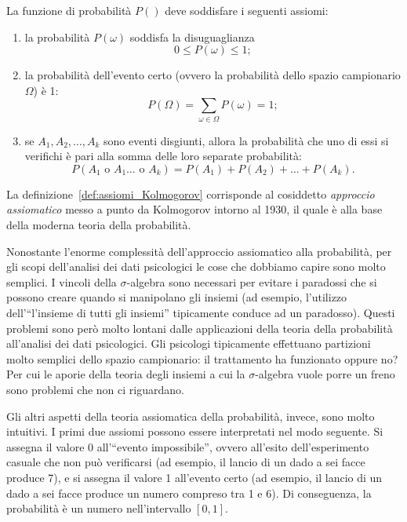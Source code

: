 La funzione di probabilità $P()$ deve soddisfare i seguenti assiomi:
\begin{enumerate}
\item la probabilità $P(\omega)$ soddisfa la disuguaglianza 
\begin{equation}
0 \leq P(\omega) \leq 1;
\end{equation}
\item la probabilità dell'evento certo (ovvero la probabilità dello spazio campionario $\Omega$) è 1:
\begin{equation}
P(\Omega) = \sum_{\omega \in \Omega} P(\omega) = 1;
\label{eq:tot_prob_sample_space}
\end{equation}
\item se $A_1, A_2, \dots, A_k$ sono eventi disgiunti, allora la probabilità che uno di essi si verifichi è pari alla somma delle loro separate probabilità:
\begin{equation}
P(A_1 \text{ o } A_1 \dots \text{ o } A_k) = P(A_1) + P(A_2) +\dots + P(A_k). \label{eq:kolmogorov_3}
\end{equation}
\end{enumerate}
La definizione~\ref{def:assiomi_Kolmogorov} corrisponde al cosiddetto \emph{approccio assiomatico} messo a punto da Kolmogorov intorno al 1930, il quale è alla base della moderna teoria della probabilità. 

Nonostante l'enorme complessità dell'approccio assiomatico alla probabilità, per gli scopi dell'analisi dei dati psicologici le cose che dobbiamo capire sono molto semplici.
I vincoli della $\sigma$-algebra sono necessari per evitare i paradossi che si possono creare quando si manipolano gli insiemi (ad esempio, l'utilizzo dell'\enquote{l'insieme di tutti gli insiemi} tipicamente conduce ad un paradosso).
Questi problemi sono però molto lontani dalle applicazioni della teoria della probabilità all'analisi dei dati psicologici.
Gli psicologi tipicamente effettuano partizioni molto semplici dello spazio campionario: il trattamento ha funzionato oppure no?
Per cui le aporie della teoria degli insiemi a cui la $\sigma$-algebra vuole porre un freno sono problemi che non ci riguardano.

Gli altri aspetti della teoria assiomatica della probabilità, invece, sono molto intuitivi.
I primi due assiomi possono essere interpretati nel modo seguente.
Si assegna il valore 0 all'\enquote{evento impossibile}, ovvero all'esito dell'esperimento casuale che non può verificarsi (ad esempio, il lancio di un dado a sei facce produce 7), e si assegna il valore 1 all'evento certo (ad esempio, il lancio di un dado a sei facce produce un numero compreso tra 1 e 6).
Di conseguenza, la probabilità è un numero nell'intervallo $[0, 1]$.

